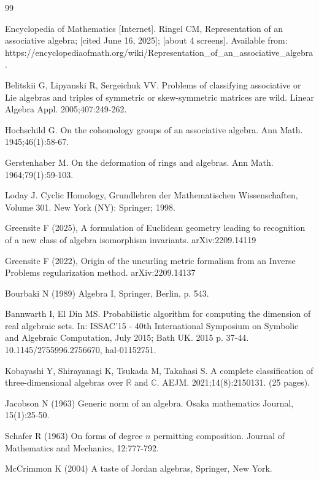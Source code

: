 \documentclass{amsart}
\theoremstyle{definition}
\numberwithin{theorem}{section}
\numberwithin{equation}{section}
\begin{document}
\bigskip\bigskip



   \begin{thebibliography}{99}
   
 Encyclopedia of Mathematics [Internet].  Ringel CM, Representation of an associative algebra; [cited June 16, 2025]; [about 4 screens]. Available from: \\ https://encyclopediaofmath.org/wiki/Representation\_of\_an\_associative\_algebra.
          
        Belitskii G, Lipyanski R, Sergeichuk VV.  Problems of classifying associative or Lie algebras and triples of symmetric or skew-symmetric matrices are wild.  Linear Algebra Appl.  2005;407:249-262.
       
            Hochschild G.  On the cohomology groups of an associative algebra.   Ann Math.  1945;46(1):58-67.
       
             Gerstenhaber M.  On the deformation of rings and algebras.  Ann Math.  1964;79(1):59-103.
             
             Loday J. Cyclic Homology, Grundlehren der Mathematischen Wissenschaften, Volume 301.  New York (NY): Springer; 1998.              
            
             Greensite F (2025), A formulation of Euclidean geometry leading to recognition of a new class of algebra isomorphism invariants. arXiv:2209.14119

 Greensite F (2022), Origin of the uncurling metric formalism from an Inverse Problems regularization method. arXiv:2209.14137      

 Bourbaki N (1989) Algebra I, Springer, Berlin, p. 543.   

 Bannwarth I, El Din MS.  Probabilistic algorithm for computing the dimension of real algebraic sets. In: ISSAC'15 - 40th International Symposium on Symbolic and Algebraic Computation, July 2015; Bath UK. 2015 p. 37-44.  10.1145/2755996.2756670, hal-01152751.     
                 
 Kobayashi Y, Shirayanagi K, Tsukada M, Takahasi S.  A complete classification of three-dimensional algebras over $\mathbb{R}$ and $\mathbb{C}$.  AEJM.   2021;14(8):2150131. (25 pages).

               Jacobson N  (1963) Generic norm of an algebra. Osaka mathematics Journal, 15(1):25-50.
  
          Schafer R (1963) On forms of degree $n$ permitting composition. Journal of Mathematics and Mechanics, 12:777-792.       
      
        McCrimmon K (2004) A taste of Jordan algebras, Springer, New York.
 
      \end{thebibliography}
      
  \bigskip \bigskip        
      

 
 
\end{document}
